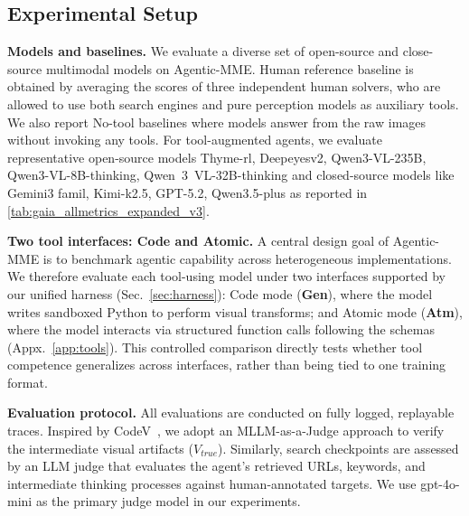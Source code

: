 \documentclass[runningheads]{llncs}
\theoremstyle{plain}
\theoremstyle{definition}
\theoremstyle{remark}
\begin{document}
\subsection{Experimental Setup}
\noindent\textbf{Models and baselines.} We evaluate a diverse set of open-source and close-source multimodal models on Agentic-MME. Human reference baseline is obtained by averaging the scores of three independent human solvers, who are allowed to use both search engines and pure perception models as auxiliary tools. We also report No-tool baselines where models answer from the raw images without invoking any tools.
For tool-augmented agents, we evaluate representative open-source models Thyme-rl\cite{zhang2025thyme}, Deepeyesv2\cite{hong2025deepeyesv2}, Qwen3-VL-235B, Qwen3-VL-8B-thinking, Qwen~3~VL-32B-thinking\cite{bai2025qwen3} and closed-source models like Gemini3 famil\cite{team2023gemini}, Kimi-k2.5\cite{team2026kimi}, GPT-5.2\cite{openai2025thinking}, Qwen3.5-plus\cite{qwen35blog} as reported in \cref{tab:gaia_allmetrics_expanded_v3}.

\vspace{1mm}
\noindent\textbf{Two tool interfaces: Code and Atomic.}
A central design goal of Agentic-MME is to benchmark agentic capability across heterogeneous implementations.
We therefore evaluate each tool-using model under two interfaces supported by our unified harness (Sec.~\ref{sec:harness}):
Code mode (\textbf{Gen}), where the model writes sandboxed Python to perform visual transforms; and
Atomic mode (\textbf{Atm}), where the model interacts via structured function calls following the schemas (Appx.~\ref{app:tools}). This controlled comparison directly tests whether tool competence generalizes across interfaces, rather than being tied to one training format.

\noindent\textbf{Evaluation protocol.} All evaluations are conducted on fully logged, replayable traces. Inspired by CodeV~\cite{hou2025codev}, we adopt an MLLM-as-a-Judge approach to verify the intermediate visual artifacts ($V_{true}$). Similarly, search checkpoints are assessed by an LLM judge that evaluates the agent's retrieved URLs, keywords, and intermediate thinking processes against human-annotated targets. We use gpt-4o-mini\cite{hurst2024gpt} as the primary judge model in our experiments.
\end{document}
